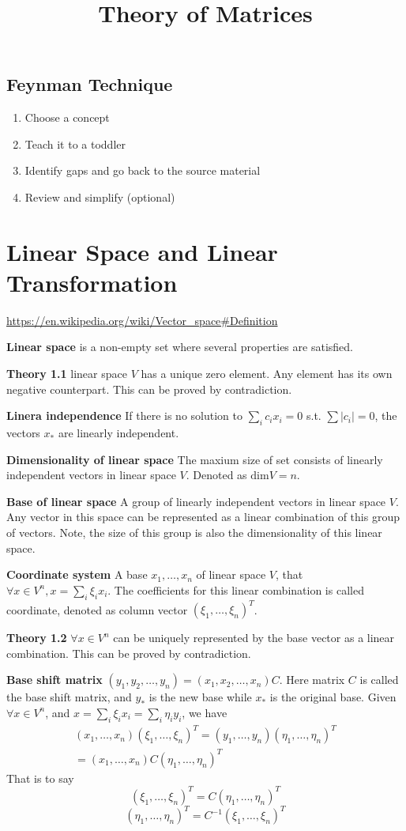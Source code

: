 \title{Theory of Matrices}

\subsection{Feynman Technique}
\begin{enumerate}
	\item Choose a concept
	\item Teach it to a toddler
	\item Identify gaps and go back to the source material
	\item Review and simplify (optional)
\end{enumerate}

\section{Linear Space and Linear Transformation}
\url{https://en.wikipedia.org/wiki/Vector_space#Definition}

{\bf Linear space} is a non-empty set where several properties are satisfied.

{\bf Theory 1.1} linear space $V$ has a unique zero element. Any element has
its own negative counterpart. This can be proved by contradiction.

{\bf Linera independence} If there is no solution to $\sum_i c_i x_i = 0$ s.t.
$\sum|c_i|=0$, the vectors $x_*$ are linearly independent.

{\bf Dimensionality of linear space} The maxium size of set consists of
linearly independent vectors in linear space $V$. Denoted as $\text{dim}V=n$.

{\bf Base of linear space} A group of linearly independent vectors in linear
space $V$. Any vector in this space can be represented as a linear combination
of this group of vectors. Note, the size of this group is also the
dimensionality of this linear space.

{\bf Coordinate system} A base $x_1,\ldots,x_n$ of linear space $V$, that
$\forall x\in V^n, x = \sum_i \xi_i x_i$. The coefficients for this linear
combination is called coordinate, denoted as column vector $(\xi_1,\ldots,\xi_n)^T$.

{\bf Theory 1.2} $\forall x\in V^n$ can be uniquely represented by the base
vector as a linear combination. This can be proved by contradiction.

{\bf Base shift matrix} $(y_1,y_2,\ldots,y_n) = (x_1,x_2,\ldots,x_n)C$.
Here matrix $C$ is called the base shift matrix, and $y_*$ is the new base
while $x_*$ is the original base. Given $\forall x\in V^n$, and
$x = \sum_i \xi_i x_i = \sum_i \eta_i y_i$, we have
\begin{align}
(x_1,\ldots,x_n)(\xi_1,\ldots,\xi_n)^T = (y_1,\ldots,y_n)(\eta_1,\ldots,\eta_n)^T \\= (x_1,\ldots,x_n)C(\eta_1,\ldots,\eta_n)^T
\end{align}
That is to say
$$(\xi_1,\ldots,\xi_n)^T = C(\eta_1,\ldots,\eta_n)^T$$
$$(\eta_1,\ldots,\eta_n)^T = C^{-1}(\xi_1,\ldots,\xi_n)^T$$

